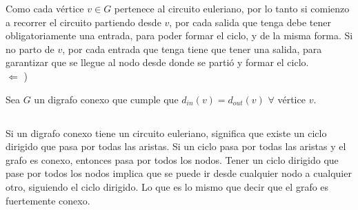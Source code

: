 Como cada vértice $v \in G$ pertenece al circuito euleriano, por lo tanto si comienzo a recorrer el circuito partiendo desde $v$, por cada salida que tenga debe tener obligatoriamente una entrada, para poder formar el ciclo, y de la misma forma. Si no parto de $v$, por cada entrada que tenga tiene que tener una salida, para garantizar que se llegue al nodo desde donde se partió y formar el ciclo. \\

$\Longleftarrow$ )

Sea $G$ un digrafo conexo que cumple que $d_{in}(v) = d_{out}(v)$ $\forall$ vértice $v$. 

\subsection{}

Si un digrafo conexo tiene un circuito euleriano, significa que existe un ciclo dirigido que pasa por todas las aristas. Si un ciclo pasa por todas las aristas y el grafo es conexo, entonces pasa por todos los nodos. Tener un ciclo dirigido que pase por todos los nodos implica que se puede ir desde cualquier nodo a cualquier otro, siguiendo el ciclo dirigido. Lo que es lo mismo que decir que el grafo es fuertemente conexo.